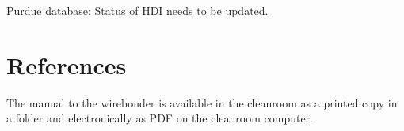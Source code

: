 \documentclass[12pt]{unlsilabsop}
\begin{document}
Purdue database: Status of HDI needs to be updated.

\section{References}

The manual to the wirebonder is available in the cleanroom as a printed copy in a folder and electronically as PDF on the cleanroom computer.
\end{document}
